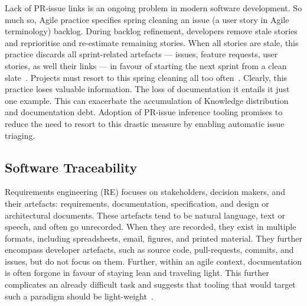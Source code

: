 Lack of PR-issue links is an ongoing problem in modern software development.  So
much so, Agile practice specifies spring cleaning an issue (a user story in
Agile terminology) backlog. During backlog refinement, developers remove stale
stories and reprioritise and re-estimate remaining stories. When all stories are
stale, this practice discards all sprint-related artefacts --- issues, feature
requests, user stories, as well their links --- in favour of starting the next
sprint from a clean slate~\cite{BacklogRefinement}. Projects must resort to this
spring cleaning all too often~\cite{laurieTrattPersonalCommunciation}. Clearly,
this practice loses valuable information. The loss of documentation it entails
it just one example. This can exacerbate the accumulation of Knowledge
distribution and documentation debt. Adoption of PR-issue inference tooling
promises to reduce the need to resort to this drastic measure by enabling
automatic issue triaging.

\subsection{Software Traceability}
\label{chapter:literature:sec:am_rel_work:tracability}

Requirements engineering (RE) focuses on stakeholders, decision makers, and
their artefacts: requirements, documentation, specification, and design or
architectural documents. These artefacts tend to be natural language, text or
speech, and often go unrecorded. When they are recorded, they exist in multiple
formats, including spreadsheets, email, figures, and printed material. They
further encompass developer artefacts, such as source code, pull-requests,
commits, and issues, but do not focus on them. Further, within an agile context,
documentation is often forgone in favour of staying lean and traveling light.
This further complicates an already difficult task and suggests that tooling
that would target such a paradigm should be light-weight~\cite{Stahl2017}.


